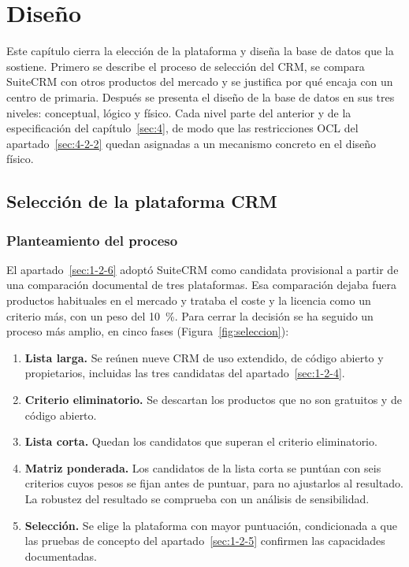 
\chapter{Diseño}\label{sec:dis}

Este capítulo cierra la elección de la plataforma y diseña la base de datos que la sostiene. Primero se describe el proceso de selección del CRM, se compara SuiteCRM con otros productos del mercado y se justifica por qué encaja con un centro de primaria. Después se presenta el diseño de la base de datos en sus tres niveles: conceptual, lógico y físico. Cada nivel parte del anterior y de la especificación del capítulo~\ref{sec:4}, de modo que las restricciones OCL del apartado~\ref{sec:4-2-2} quedan asignadas a un mecanismo concreto en el diseño físico.

\section{Selección de la plataforma CRM}\label{sec:dis-seleccion}

\subsection{Planteamiento del proceso}\label{sec:dis-proceso}

El apartado~\ref{sec:1-2-6} adoptó SuiteCRM como candidata provisional a partir de una comparación documental de tres plataformas. Esa comparación dejaba fuera productos habituales en el mercado y trataba el coste y la licencia como un criterio más, con un peso del 10~\%. Para cerrar la decisión se ha seguido un proceso más amplio, en cinco fases (Figura~\ref{fig:seleccion}):

\begin{enumerate}
  \item \textbf{Lista larga.} Se reúnen nueve CRM de uso extendido, de código abierto y propietarios, incluidas las tres candidatas del apartado~\ref{sec:1-2-4}.
  \item \textbf{Criterio eliminatorio.} Se descartan los productos que no son gratuitos y de código abierto.
  \item \textbf{Lista corta.} Quedan los candidatos que superan el criterio eliminatorio.
  \item \textbf{Matriz ponderada.} Los candidatos de la lista corta se puntúan con seis criterios cuyos pesos se fijan antes de puntuar, para no ajustarlos al resultado. La robustez del resultado se comprueba con un análisis de sensibilidad.
  \item \textbf{Selección.} Se elige la plataforma con mayor puntuación, condicionada a que las pruebas de concepto del apartado~\ref{sec:1-2-5} confirmen las capacidades documentadas.
\end{enumerate}

